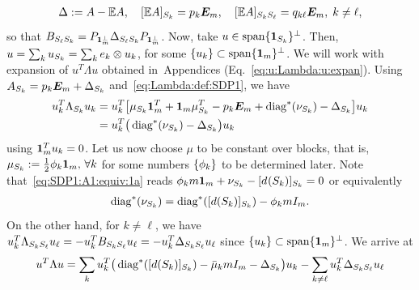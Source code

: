 \begin{align}
  \label{eq:SDP1:Delta:def}
  \Delta := A - \mathbb{E} A, \quad  [\mathbb{E} A]_{S_{k}} = p_k \bm{E}_m, \quad [\mathbb{E} A]_{S_{k}S_{\ell}} = q_{k \ell} \bm{E}_m, \; k \neq \ell,
\end{align}
so that $B_{S_{\ell}S_{k}} = P_{\bm{1}_m^\perp} \Delta_{S_{\ell}S_{k}} P_{\bm{1}_m^\perp}$. 
 Now, take $u \in \operatorname{span}\{\bm{1}_{S_k}\}^\perp$. Then, $u = \sum_k u_{S_{k}} = \sum_k e_k \otimes u_k$, for some $\{u_k\} \subset \operatorname{span}\{\bm{1}_m\}^\perp$. We will work with expansion of $u^T \Lambda u$ obtained in~Appendices (Eq.~\eqref{eq:u:Lambda:u:expan}).
  Using $A_{S_{k}} = p_k \bm{E}_m + \Delta_{S_{k}}$ and~\eqref{eq:Lambda:def:SDP1}, we have
  \begin{align*}
    u_k^T \Lambda_{S_{k}} u_k 
      &= u_k^T\big[\mu_{S_{k}}  \bm{1}_m^T + \bm{1}_m \mu_{S_{k}}^T  - p_k \bm{E}_m + \operatorname{diag}^*(\nu_{S_{k}}) - \Delta_{S_{k}} \big] u_k \\
      &= u_k^T\big( \operatorname{diag}^*(\nu_{S_{k}}) - \Delta_{S_{k}} \big) u_k 
  \end{align*}
  using $\bm{1}_m^T u_k = 0$. Let us now choose $\mu$ to be constant over blocks, that is,
  $\mu_{S_{k}} := \frac12 \phi_k \bm{1}_m, \, \forall k$ 
  for some numbers $\{\phi_k\}$ to be determined later. Note that~\eqref{eq:SDP1:A1:equiv:1a} reads
   $ \phi_k m \bm{1}_m + \nu_{S_{k}} - [d_{}(S_{k})]_{S_{k}} = 0$
  or equivalently 
  \begin{align}\label{eq:nu:def:SDP1:b}
    \operatorname{diag}^*(\nu_{S_{k}}) = \operatorname{diag}^*([d(S_{k})]_{S_{k}}) - \phi_k m I_m.
  \end{align}
  On the other hand, for $k \neq \ell$, we have $u_k^T \Lambda_{S_{k}S_{\ell}} u_\ell = -u_k^T B_{S_{k}S_{\ell}} u_\ell = -u_k^T \Delta_{S_{k}S_{\ell}}  u_\ell$ 
  since $\{u_k\} \subset \operatorname{span}\{\bm{1}_m\}^\perp$. We arrive at
  \begin{align}\label{eq:u:Lambda:u:SDP1}
    u^T \Lambda u = \sum_k u_k^T\big( \operatorname{diag}^*([d(S_{k})]_{S_{k}}) - \bar{\mu}_k m I_m - \Delta_{S_{k}} \big) u_k 
    -\sum_{k \neq \ell} u_k^T \Delta_{S_{k} S_{\ell}} u_\ell
  \end{align}




